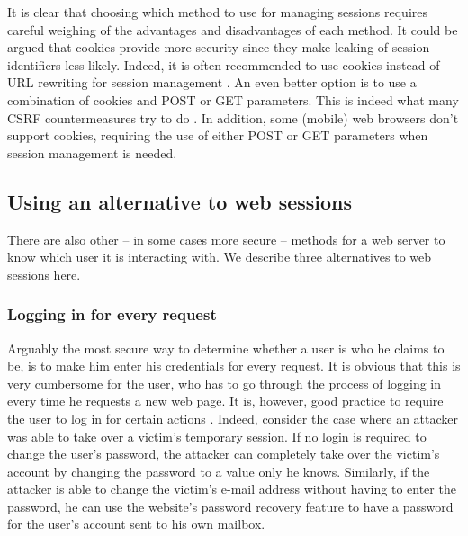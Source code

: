 It is clear that choosing which method to use for managing sessions requires careful weighing of the advantages and disadvantages of each method. It could be argued that cookies provide more security since they make leaking of session identifiers less likely. Indeed, it is often recommended to use cookies instead of URL rewriting for session management \cite{Zhong2006,Vamosi2006}. An even better option is to use a combination of cookies and POST or GET parameters. This is indeed what many CSRF countermeasures try to do \cite{Jovanovic2006,Johns2006}. In addition, some (mobile) web browsers don't support cookies, requiring the use of either POST or GET parameters when session management is needed.

\subsection{Using an alternative to web sessions}

There are also other -- in some cases more secure -- methods for a web server to know which user it is interacting with. We describe three alternatives to web sessions here.

\subsubsection{Logging in for every request}
Arguably the most secure way to determine whether a user is who he claims to be, is to make him enter his credentials for every request. It is obvious that this is very cumbersome for the user, who has to go through the process of logging in every time he requests a new web page. It is, however, good practice to require the user to log in for certain actions \cite{Webers2008}. Indeed, consider the case where an attacker was able to take over a victim's temporary session. If no login is required to change the user's password, the attacker can completely take over the victim's account by changing the password to a value only he knows. Similarly, if the attacker is able to change the victim's e-mail address without having to enter the password, he can use the website's password recovery feature to have a password for the user's account sent to his own mailbox.

